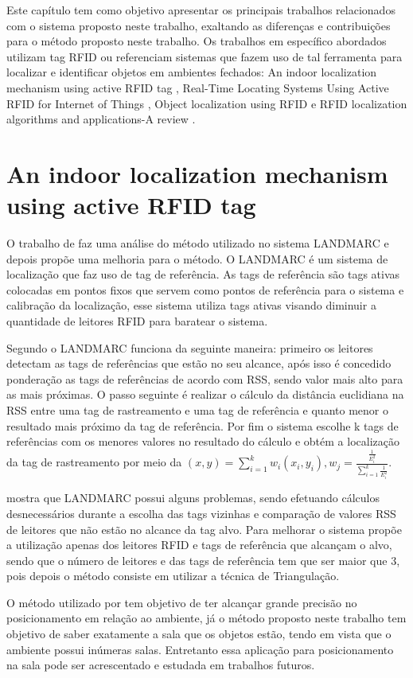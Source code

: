 \label{chapter:correlatos}
Este capítulo tem como objetivo apresentar os principais trabalhos relacionados com o sistema proposto neste trabalho, exaltando as diferenças e contribuições para o método proposto neste trabalho. Os trabalhos em específico abordados utilizam tag RFID ou referenciam sistemas que fazem uso de tal ferramenta para localizar e identificar objetos em ambientes fechados: An indoor localization mechanism using active RFID tag \cite{mechanismRFID2006}, Real-Time Locating Systems Using Active RFID for Internet of Things \cite{realtimeRFID2016}, Object localization using RFID \cite{localization2010} e RFID localization algorithms and applications-A review \cite{rfid2009review}.

\section{An indoor localization mechanism using active RFID tag}
O trabalho de  faz uma análise do método utilizado no sistema LANDMARC e depois propõe uma melhoria para o método. O LANDMARC é um sistema de localização que faz uso de tag de referência. As tags de referência são tags ativas colocadas em pontos fixos que servem como pontos de referência para o sistema e calibração da localização, esse sistema utiliza tags ativas visando diminuir a quantidade de leitores RFID para baratear o sistema.

\par
Segundo  o LANDMARC funciona da seguinte maneira: primeiro os leitores detectam as tags de referências que estão no seu alcance, após isso é concedido ponderação as tags de referências de acordo com RSS, sendo valor mais alto para as mais próximas. O passo seguinte é realizar o cálculo da distância euclidiana na RSS entre uma tag de rastreamento e uma tag de referência e quanto menor o resultado mais próximo da tag de referência. Por fim o sistema escolhe k tags de referências com os menores valores no resultado do cálculo e obtém a localização da tag de rastreamento por meio da $(x,y) = \sum^k_{i=1}w_i(x_i,y_i), w_j=\frac{\frac{1}{E_i^2}}{\sum_{i=1}^k\frac{1}{E^2_i}}$. 
\par
{} mostra que LANDMARC possui alguns problemas, sendo efetuando cálculos desnecessários durante a escolha das tags vizinhas e comparação de valores RSS de leitores que não estão no alcance da tag alvo. Para melhorar o sistema  propõe a utilização apenas dos leitores RFID  e tags de referência que alcançam o alvo, sendo que o número de leitores e das tags de referência tem que ser maior que 3, pois depois o método consiste em utilizar a técnica de Triangulação.
\par
O método utilizado por  tem objetivo de ter alcançar grande precisão no posicionamento em relação ao ambiente, já o método proposto neste trabalho tem objetivo de saber exatamente a sala que os objetos estão, tendo em vista que o ambiente possui inúmeras salas. Entretanto essa aplicação para posicionamento na sala pode ser acrescentado e estudada em trabalhos futuros.

